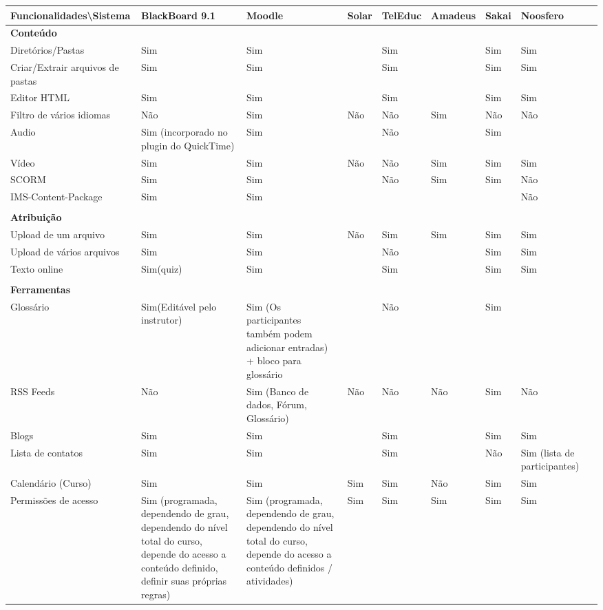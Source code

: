 \begin{table}[!htb]
\center
\begin{tabular}{@{}p{5cm}|p{4cm}|p{4cm}|p{4cm}|p{4cm}|p{4cm}|p{4cm}|p{4cm}|p{4cm}@{}}
\toprule
Funcionalidades\textbackslash Sistema & BlackBoard 9.1 & Moodle & Solar & TelEduc & Amadeus & Sakai & Noosfero &  \\ \midrule
\textbf{Conteúdo} &  &  &  &  &  &  &  &  \\
Diretórios/Pastas & Sim & Sim &  & Sim &  & Sim & Sim &  \\
Criar/Extrair arquivos de pastas & Sim & Sim &  & Sim &  & Sim & Sim &  \\
Editor HTML & Sim & Sim &  & Sim &  & Sim & Sim &  \\
Filtro de vários idiomas & Não & Sim & Não & Não & Sim & Não & Não &  \\
Audio & Sim (incorporado no plugin do QuickTime) & Sim &  & Não &  & Sim &  &  \\
Vídeo & Sim & Sim & Não & Não & Sim & Sim & Sim &  \\
SCORM & Sim & Sim &  & Não & Sim & Sim & Não &  \\
IMS-Content-Package & Sim & Sim &  &  &  &  & Não &  \\
 &  &  &  &  &  &  &  &  \\
\textbf{Atribuição} &  &  &  &  &  &  &  &  \\
Upload de um arquivo & Sim & Sim & Não & Sim & Sim & Sim & Sim &  \\
Upload de vários arquivos & Sim & Sim &  & Não &  & Sim & Sim &  \\
Texto online & Sim(quiz) & Sim &  & Sim &  & Sim & Sim &  \\
 &  &  &  &  &  &  &  &  \\
\textbf{Ferramentas} &  &  &  &  &  &  &  &  \\
Glossário & Sim(Editável pelo instrutor) & Sim (Os participantes também podem adicionar entradas) + bloco para glossário &  & Não &  & Sim &  &  \\
RSS Feeds & Não & Sim (Banco de dados, Fórum, Glossário) & Não & Não & Não & Sim & Não &  \\
Blogs & Sim & Sim &  & Sim &  & Sim & Sim &  \\
Lista de contatos & Sim & Sim &  & Sim &  & Não & Sim (lista de participantes) &  \\
Calendário (Curso) & Sim & Sim & Sim & Sim & Não & Sim & Sim &  \\
Permissões de acesso & Sim (programada, dependendo de grau, dependendo do nível total do curso, depende do acesso a conteúdo definido, definir suas próprias regras) & Sim (programada, dependendo de grau, dependendo do nível total do curso, depende do acesso a conteúdo definidos / atividades) & Sim & Sim & Sim & Sim & Sim &  \\

\end{tabular}
\end{table}
